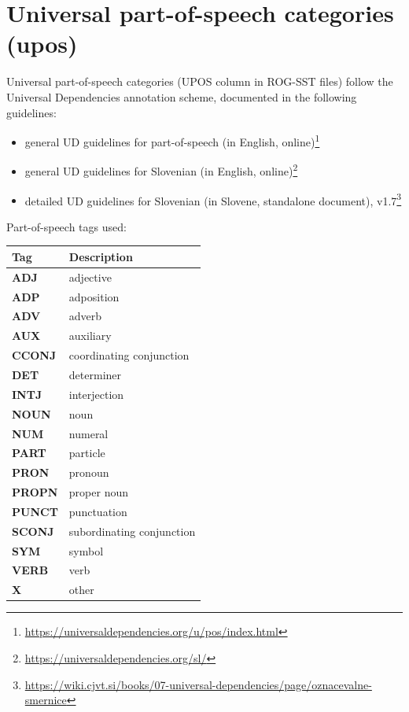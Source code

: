 \documentclass[a4paper,oneside,12pt]{article}
\begin{document}
\section{Universal part-of-speech categories (upos)}

Universal part-of-speech categories (UPOS column in ROG-SST files) follow the
Universal Dependencies annotation scheme, documented in the following
guidelines:
\begin{itemize}
  \item general UD guidelines for part-of-speech (in English,
        online)\footnote{\url{https://universaldependencies.org/u/pos/index.html}}
  \item general UD guidelines for Slovenian (in English,
        online)\footnote{\url{https://universaldependencies.org/sl/}}
  \item detailed UD guidelines for Slovenian (in Slovene, standalone document),
        v1.7\footnote{\url{https://wiki.cjvt.si/books/07-universal-dependencies/page/oznacevalne-smernice}}
\end{itemize}
\begin{samepage}

  Part-of-speech tags used:
  \begin{center}

    \begin{tabular}{|l|l|}
      \hline
      \textbf{Tag}   & \textbf{Description}      \\ \hline
      \textbf{ADJ}   & adjective                 \\ \hline
      \textbf{ADP}   & adposition                \\ \hline
      \textbf{ADV}   & adverb                    \\ \hline
      \textbf{AUX}   & auxiliary                 \\ \hline
      \textbf{CCONJ} & coordinating conjunction  \\ \hline
      \textbf{DET}   & determiner                \\ \hline
      \textbf{INTJ}  & interjection              \\ \hline
      \textbf{NOUN}  & noun                      \\ \hline
      \textbf{NUM}   & numeral                   \\ \hline
      \textbf{PART}  & particle                  \\ \hline
      \textbf{PRON}  & pronoun                   \\ \hline
      \textbf{PROPN} & proper noun               \\ \hline
      \textbf{PUNCT} & punctuation               \\ \hline
      \textbf{SCONJ} & subordinating conjunction \\ \hline
      \textbf{SYM}   & symbol                    \\ \hline
      \textbf{VERB}  & verb                      \\ \hline
      \textbf{X}     & other                     \\ \hline
    \end{tabular}
  \end{center}
\end{samepage}
\end{document}
